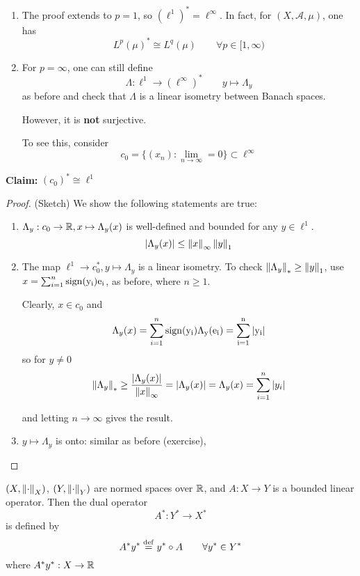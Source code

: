 \documentclass{article}
\begin{document}
\begin{remark}
    \begin{enumerate}[1)]
        \item The proof extends to  \(p=1\), so  \((\ell^1)^* = \ell^{\infty}\). In fact, for  \((X, \mathcal{A}, \mu)\), one has  
        \[L^p(\mu)^* \cong L^q(\mu) \qquad \forall p \in [1, \infty)\]
        \item For  \(p=\infty\), one can still define  
        \[\Lambda: \ell^1 \to (\ell^{\infty})^* \qquad y \mapsto \Lambda_y\]
        as before and check that  \(\Lambda\) is a linear isometry between Banach spaces.
        
        However, it is \textbf{not} surjective.  
        
        To see this, consider 
        \[c_0 = \{(x_n): \lim_{n \to \infty} = 0\} \subset \ell^{\infty}\]
    \end{enumerate}

\textbf{Claim:} \((c_0)^* \cong \ell^1\ \)
\begin{proof}
    (Sketch) We show the following statements are true:
    \begin{enumerate}[1)]
        \item \(\Lambda_y: c_0 \to \mathbb{R}, x \mapsto \Lambda_y(x)\) is well-defined and bounded for any 
         \(y \in \ell^1\).  
        \[|\Lambda_y(x)| \leq \left\|{x}\right\|_{\infty} \left\|{y}\right\|_1\]

        \item The map \( \ell^1 \to c_0^*, y \mapsto \Lambda_y\) is a linear isometry. To check 
        \(\left\|{\Lambda_y}\right\|_* \geq \left\|{y}\right\|_1\), use \(x = \sum_{i=1}^n \rm{sign}(y_i)e_i\), as before, where
        \(n \geq 1\).  

        Clearly, \(x \in c_0\) and  
        \[\Lambda_y(x) = \sum_{i=1}^n \rm{sign}(y_i) \Lambda_y(e_i)=\sum_{i=1}^n |y_i|\]
        so for \(y \neq 0\)  
        \[\left\|{\Lambda_y}\right\|_* \geq \frac{|\Lambda_y(x)|}{\left\|{x}\right\|_{\infty}}=|\Lambda_y(x)|=\Lambda_y(x)=\sum_{i=1}^n |y_i|\]

        and letting \(n \to \infty\) gives the result.  

        \item \(y \mapsto \Lambda_y\) is onto: similar as before (exercise),
    \end{enumerate}
\end{proof}
\end{remark}  

\begin{definition}
    \nl
    \((X, \left\|{\cdot}\right\|_X)\), \((Y, \left\|{\cdot}\right\|_Y)\) are normed spaces over \(\mathbb{R}\), and \(A: X \to Y\) is a bounded linear operator.  
    Then the dual operator 
    \[A^*: Y^* \to X^*\]
    is defined by  
    \[A^* y^* \overset{\rm{def}}{=} y^* \circ A \qquad \forall y^* \in Y^* \]
    where \(A^* y^* : X \to \mathbb{R}\)
\end{definition}  
\end{document}
